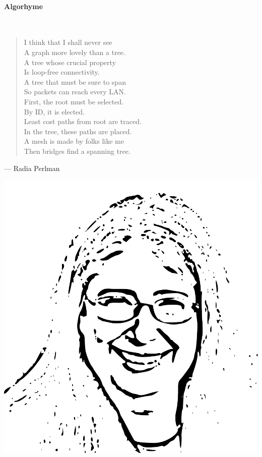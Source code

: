 \paragraph{Algorhyme}\ \\

\begin{minipage}{.5\linewidth}
  \begin{verse}
    I think that I shall never see\\
    A graph more lovely than a tree.\\[1ex]
    A tree whose crucial property\\
    Is loop-free connectivity.\\[1ex]
    A tree that must be sure to span\\
    So packets can reach every LAN.\\[1ex]
    First, the root must be selected.\\
    By ID, it is elected.\\[1ex]
    Least cost paths from root are traced.\\
    In the tree, these paths are placed.\\[1ex]
    A mesh is made by folks like me\\
    Then bridges find a spanning tree.\\[1ex]
  \end{verse}
  \begin{flushright}{\footnotesize --- Radia Perlman\hspace{3em}}\end{flushright}
\end{minipage}
\begin{minipage}{.2\linewidth}
  \includegraphics[width=\textwidth]{radia}
\end{minipage}

